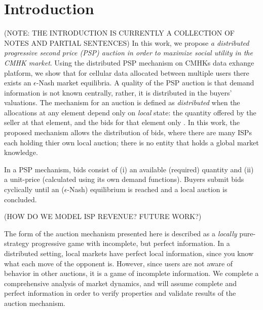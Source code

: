 \documentclass[sigconf, anonymous]{acmart}
\theoremstyle{definition}
\begin{document}

\fi
\maketitle

\section{Introduction}

(NOTE: THE INTRODUCTION IS CURRENTLY A COLLECTION OF NOTES AND PARTIAL
SENTENCES)
In this work, we propose \emph{a distributed progressive second price (PSP) auction in
order to maximize social utility in the CMHK market}. Using the
distributed PSP mechanism on CMHKs data
exhange platform, we show that for cellular data allocated between multiple users there
exists an $\epsilon$-Nash market equilibria. A quality of the PSP auction is that
demand information is not known centrally, rather, it is distributed in the
buyers' valuations. The mechanism for an auction is defined
as \emph{distributed} when the allocations at any element depend only on
\emph{local} state: the quantity offered by the seller at that element, and the
bids for that element only \cite{lazar}. In this work, the proposed mechanism
allows the distribution of bids, where there are many ISPs each holding
thier own local auction; there is no entity that holds a global market knowledge.

In a PSP mechanism, bids consist of (i) an available (required) quantity and (ii) a unit-price (calculated
using its own demand functions). Buyers submit bids cyclically until an
($\epsilon$-Nash) equilibrium is reached and a local auction is concluded. 

(HOW DO WE MODEL ISP REVENUE? FUTURE WORK?)

The form of the auction mechanism presented here is described as a \emph{locally}
pure-strategy progressive game with incomplete, but perfect information.
In a distributed setting, local markets have perfect local information, since you know what each move of the opponent is.
However, since users are not aware of behavior in other auctions, it is a game of incomplete information.
We complete a comprehensive analysis of market dynamics, and will assume
complete and perfect information in order to verify properties and validate
results of the auction mechanism.
\end{document}
